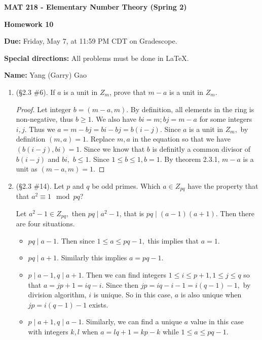\documentclass[11pt,a4paper]{article}
\begin{document}
\begin{Large}
\centerline{\bf MAT 218 - Elementary Number Theory (Spring 2)}\medskip
\centerline{\bf Homework 10}\medskip
\end{Large}
{\bf Due:} Friday, May 7, at 11:59 PM CDT on Gradescope.

{\bf Special directions:}  All problems must be done in \LaTeX.

{\bf Name:} Yang (Garry) Gao


\hrulefill

\begin{enumerate}

	\item (\S 2.3 \#6). If \(a\) is a unit in \(Z_{m}\), prove that \(m-a\) is a unit in \(Z_{m}\).

	\begin{proof}
		Let integer $b = (m-a, m).$ By definition, all elements in the ring is non-negative, thus $b \geq 1.$ We also have $bi = m; bj = m-a$ for some integers $i,j.$ Thus we $a = m-bj = bi-bj = b(i-j).$ Since $a$ is a unit in \(Z_{m},\) by definition $(m,a) = 1.$ Replace $m,a$ in the equation so that we have $(b(i-j), bi) = 1.$ Since we know that $b$ is definitly a common divisor of $b(i-j)$ and $bi,$ $b\leq 1.$ Since $1 \leq b \leq 1, b=1.$ By theorem 2.3.1, $m-a$ is a unit as $(m-a, m) = 1.$
	\end{proof}

	\item (\S 2.3 \#14). Let \(p\) and \(q\) be odd primes.  Which \(a \in Z_{pq}\) have the property that that \(a^{2} \equiv 1 \mod pq\)?

	Let \(a^2-1 \in Z_{pq},\) then $pq \mid a^2-1$, that is $pq \mid (a-1)(a+1).$ Then there are four situations.

	\begin{itemize}
		\item $pq \mid a-1.$ Then since $1 \leq a \leq pq-1,$ this implies that $a=1.$
		\item $pq \mid a+1.$ Similarly this implies $a=pq-1.$
		\item $p \mid a-1, q \mid a+1.$ Then we can find integers $1 \leq i \leq p+1, 1 \leq j \leq q$ so that $a = jp+1 = iq-i.$ Since then $jp = iq-i-1 = i(q-1)-1,$ by division algorithm, $i$ is unique. So in this case, $a$ is also unique when $jp = i(q-1)-1$ exists.
		\item $p \mid a+1, q \mid a-1.$ Similarly, we can find a unique $a$ value in this case with integers $k, l$ when $a = lq+1 = kp-k$ while $1 \leq a \leq pq-1.$
	\end{itemize}


\end{enumerate}
\end{document}
